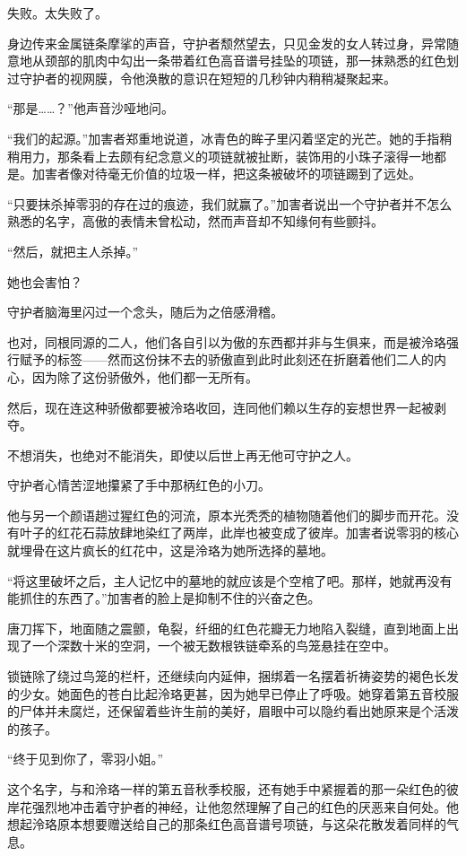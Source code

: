 \documentclass[UTF8, scheme = chinese, openany]{ctexbook}
\begin{document}
失败。太失败了。

身边传来金属链条摩挲的声音，守护者颓然望去，只见金发的女人转过身，异常随意地从颈部的肌肉中勾出一条带着红色高音谱号挂坠的项链，那一抹熟悉的红色划过守护者的视网膜，令他涣散的意识在短短的几秒钟内稍稍凝聚起来。

“那是……？”他声音沙哑地问。

“我们的起源。”加害者郑重地说道，冰青色的眸子里闪着坚定的光芒。她的手指稍稍用力，那条看上去颇有纪念意义的项链就被扯断，装饰用的小珠子滚得一地都是。加害者像对待毫无价值的垃圾一样，把这条被破坏的项链踢到了远处。

“只要抹杀掉零羽的存在过的痕迹，我们就赢了。”加害者说出一个守护者并不怎么熟悉的名字，高傲的表情未曾松动，然而声音却不知缘何有些颤抖。

“然后，就把主人杀掉。”

她也会害怕？

守护者脑海里闪过一个念头，随后为之倍感滑稽。

也对，同根同源的二人，他们各自引以为傲的东西都并非与生俱来，而是被泠珞强行赋予的标签——然而这份抹不去的骄傲直到此时此刻还在折磨着他们二人的内心，因为除了这份骄傲外，他们都一无所有。

然后，现在连这种骄傲都要被泠珞收回，连同他们赖以生存的妄想世界一起被剥夺。

不想消失，也绝对不能消失，即使以后世上再无他可守护之人。

守护者心情苦涩地攥紧了手中那柄红色的小刀。

他与另一个颜语趟过猩红色的河流，原本光秃秃的植物随着他们的脚步而开花。没有叶子的红花石蒜放肆地染红了两岸，此岸也被变成了彼岸。加害者说零羽的核心就埋骨在这片疯长的红花中，这是泠珞为她所选择的墓地。

“将这里破坏之后，主人记忆中的墓地的就应该是个空棺了吧。那样，她就再没有能抓住的东西了。”加害者的脸上是抑制不住的兴奋之色。

唐刀挥下，地面随之震颤，龟裂，纤细的红色花瓣无力地陷入裂缝，直到地面上出现了一个深数十米的空洞，一个被无数根铁链牵系的鸟笼悬挂在空中。

锁链除了绕过鸟笼的栏杆，还继续向内延伸，捆绑着一名摆着祈祷姿势的褐色长发的少女。她面色的苍白比起泠珞更甚，因为她早已停止了呼吸。她穿着第五音校服的尸体并未腐烂，还保留着些许生前的美好，眉眼中可以隐约看出她原来是个活泼的孩子。

“终于见到你了，零羽小姐。”

这个名字，与和泠珞一样的第五音秋季校服，还有她手中紧握着的那一朵红色的彼岸花强烈地冲击着守护者的神经，让他忽然理解了自己的红色的厌恶来自何处。他想起泠珞原本想要赠送给自己的那条红色高音谱号项链，与这朵花散发着同样的气息。
\end{document}
